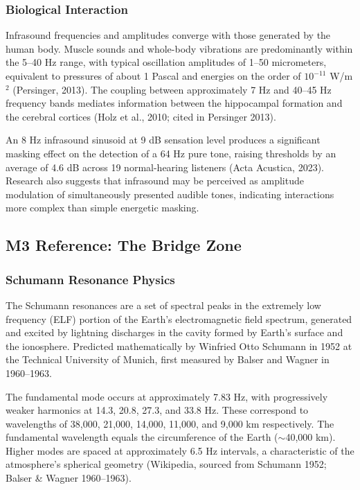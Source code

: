 \documentclass[11pt,letterpaper]{article}
\begin{document}
\subsubsection{Biological Interaction}
Infrasound frequencies and amplitudes converge with those generated by the human body. Muscle sounds and whole-body vibrations are predominantly within the 5--40 Hz range, with typical oscillation amplitudes of 1--50 micrometers, equivalent to pressures of about 1 Pascal and energies on the order of $10^{-11}$ W/m$^2$ (Persinger, 2013). The coupling between approximately 7 Hz and 40--45 Hz frequency bands mediates information between the hippocampal formation and the cerebral cortices (Holz et al., 2010; cited in Persinger 2013).

An 8 Hz infrasound sinusoid at 9 dB sensation level produces a significant masking effect on the detection of a 64 Hz pure tone, raising thresholds by an average of 4.6 dB across 19 normal-hearing listeners (Acta Acustica, 2023). Research also suggests that infrasound may be perceived as amplitude modulation of simultaneously presented audible tones, indicating interactions more complex than simple energetic masking.

\subsection{M3 Reference: The Bridge Zone}

\subsubsection{Schumann Resonance Physics}
The Schumann resonances are a set of spectral peaks in the extremely low frequency (ELF) portion of the Earth's electromagnetic field spectrum, generated and excited by lightning discharges in the cavity formed by Earth's surface and the ionosphere. Predicted mathematically by Winfried Otto Schumann in 1952 at the Technical University of Munich, first measured by Balser and Wagner in 1960--1963.

The fundamental mode occurs at approximately 7.83 Hz, with progressively weaker harmonics at 14.3, 20.8, 27.3, and 33.8 Hz. These correspond to wavelengths of 38,000, 21,000, 14,000, 11,000, and 9,000 km respectively. The fundamental wavelength equals the circumference of the Earth ($\sim$40,000 km). Higher modes are spaced at approximately 6.5 Hz intervals, a characteristic of the atmosphere's spherical geometry (Wikipedia, sourced from Schumann 1952; Balser \& Wagner 1960--1963).
\end{document}
